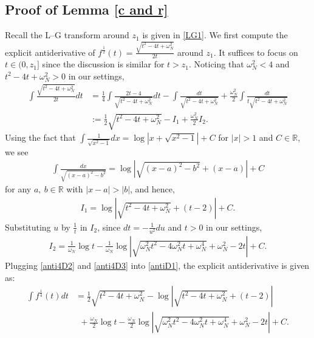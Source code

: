 \documentclass[11pt]{article}
\numberwithin{equation}{section}%
\numberwithin{theorem}{section}
\begin{document}
\subsection{Proof of Lemma \ref{c and r}}\label{P4CandR}
Recall the L--G transform around $z_1$ is given in \eqref{LG1}. We first compute the explicit antiderivative of $f^\frac{1}{2}(t)=\frac{\sqrt{t^2-4t+\omega_N^2}}{2t}$ around $z_1$. It suffices to focus on $t\in(0,z_1]$ since the discussion is similar for $t>z_1$. Noticing that $\omega_N^2<4$ and $t^2-4t+\omega_N^2>0$ in our settings,
\begin{equation}\label{antiD1}
\begin{split}
       \int \frac{\sqrt{t^2-4t+\omega_N^2}}{2t}dt&=\frac{1}{4}\int\frac{2t-4}{\sqrt{t^2-4t+\omega_N^2}}dt-\int\frac{dt}{\sqrt{t^2-4t+\omega_N^2}}+\frac{\omega_N^2}{2}\int\frac{dt}{t\sqrt{t^2-4t+\omega_N^2}}\\
       &:=\frac{1}{2}\sqrt{t^2-4t+\omega_N^2}-I_1+\frac{\omega_N^2}{2}I_2.
\end{split}
\end{equation}
Using the fact that $\int\frac{1}{\sqrt{x^2-1}}dx=\log|x+\sqrt{x^2-1}|+C$ for $|x|>1$ and $C\in\mathbb{R}$, we see
\begin{equation*}
    \begin{split}
        \int\frac{dx}{\sqrt{(x-a)^2-b^2}}=\log|\sqrt{(x-a)^2-b^2}+(x-a)|+C
    \end{split}
\end{equation*}
for any $a,~b\in\mathbb{R}$ with $|x-a|>|b|$, and hence,
\begin{equation}\label{anti4D2}
    \begin{split}
        I_1=\log|\sqrt{t^2-4t+\omega_N^2}+(t-2)|+C.
    \end{split}
\end{equation}
Substituting $u$ by $\frac{1}{t}$ in $I_2$, since $dt=-\frac{1}{u^2}du$ and $t>0$ in our settings,
\begin{equation}\label{anti4D3}
    \begin{split}
        I_2=\frac{1}{\omega_N}\log t-\frac{1}{\omega_N}\log\left|\sqrt{\omega_N^2t^2-4\omega_N^2t+\omega_N^4}+\omega_N^2-2t\right|+C.
    \end{split}
\end{equation}
Plugging \eqref{anti4D2} and \eqref{anti4D3} into \eqref{antiD1}, the explicit antiderivative is given as:
\begin{equation}\label{anti4zLG}
    \begin{split}
        \int f^\frac{1}{4}(t)dt&=\frac{1}{2}\sqrt{t^2-4t+\omega_N^2}-\log|\sqrt{t^2-4t+\omega_N^2}+(t-2)|\\&~~+\frac{\omega_N}{2}\log t-\frac{\omega_N}{2}\log\left|\sqrt{\omega_N^2t^2-4\omega_N^2t+\omega_N^4}+\omega_N^2-2t\right|+C.
    \end{split}
\end{equation}
\end{document}

